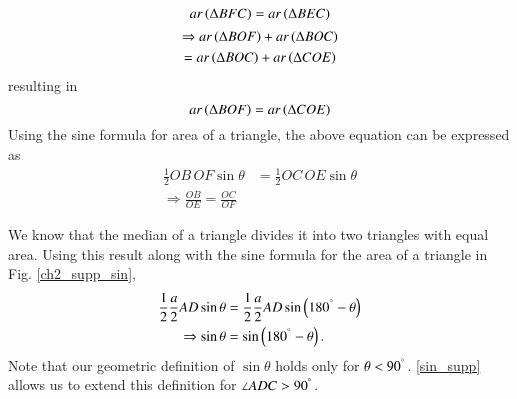 \begin{equation}
ar \left(\Delta BFC\right) = ar \left(\Delta BEC\right)
\end{equation}
%
\begin{multline}
\Rightarrow ar \left(\Delta BOF\right) + ar \left(\Delta BOC\right) \\
= ar \left(\Delta BOC\right) + ar \left(\Delta COE\right) 
\end{multline}
resulting in
%
\begin{equation}
ar \left(\Delta BOF\right) 
=  ar \left(\Delta COE\right) 
\end{equation}
%
Using the sine formula for area of a triangle, the above equation can be expressed as
%
\begin{align}
\frac{1}{2}OB\,OF \sin \theta &= \frac{1}{2}OC\,OE \sin \theta \\
\Rightarrow 	\frac{OB}{OE} = \frac{OC}{OF} 
\end{align}

\begin{definition}
	We know that the median of a triangle  divides it into two triangles with equal area. Using this result along with the sine formula for the area of a triangle in Fig. \ref{ch2_supp_sin},
\begin{align}
\frac{1}{2}\frac{a}{2}AD \sin \theta &= \frac{1}{2}\frac{a}{2}AD \sin \left(180^{\degree}-\theta\right) \\
\Rightarrow \sin \theta &= \sin \left(180^{\degree} - \theta\right).
\label{sin_supp}
\end{align}
Note that our geometric definition of $\sin \theta$ holds only for $\theta < 90^{\degree}$.  \eqref{sin_supp} allows us to extend this definition for $\angle ADC > 90^{\degree}$.
\end{definition}


